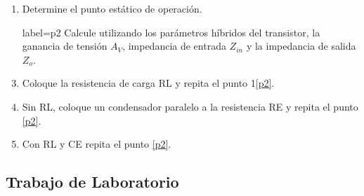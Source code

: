 \documentclass[10pt, a4paper]{article}
\begin{document}
    \begin{enumerate}
        \item Determine el punto estático de operación. \label{p1}
        \item[label=p2] Calcule utilizando los parámetros híbridos del transistor, la ganancia de tensión $A_V$, impedancia de entrada $Z_{in}$ y la impedancia de salida $Z_o$. \label{p2} %
        \item Coloque la resistencia de carga RL y repita el punto 1\ref{p2}.
        \item Sin RL, coloque un condensador paralelo a la resistencia RE y repita el punto \ref{p2}.
        \item Con RL y CE repita el punto \ref{p2}.
    \end{enumerate}

    \subsection{Trabajo de Laboratorio}
\end{document}
